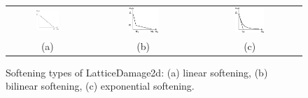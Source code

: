\documentclass[a4paper]{article}
\begin{document}
\begin{figure}[!htb]
\begin{tabular}{ccc}
\begin{htmlonly}
\end{htmlonly}
\includegraphics[width=0.3\textwidth]{figSofteningLatticeDamage2da.pdf} & \includegraphics[width=0.3\textwidth]{figSofteningLatticeDamage2db.eps} & \includegraphics[width=0.3\textwidth]{figSofteningLatticeDamage2dc.eps}\\
(a) & (b) & (c)
\end{tabular}
  \caption{Softening types of LatticeDamage2d: (a) linear softening, (b) bilinear softening, (c) exponential softening.}
  \label{SofteningLatticeDamage2d}
\end{figure}
\end{document}
